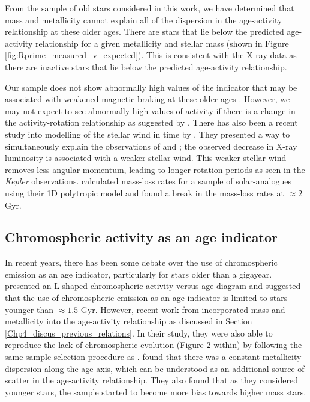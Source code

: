 From the sample of old stars considered in this work, we have determined that mass and metallicity cannot explain all of the dispersion in the age-activity relationship at these older ages. There are stars that lie below the predicted age-activity relationship for a given metallicity and stellar mass (shown in Figure \ref{fig:Rprime_measured_v_expected}). This is consistent with the X-ray data \citep{Booth_etal_2017} as there are inactive stars that lie below the predicted age-activity relationship.

Our sample does not show abnormally high values of the \Rprime indicator that may be associated with weakened magnetic braking at these older ages \citep{van_Saders_etal_2016}. However, we may not expect to see abnormally high values of activity if there is a change in the activity-rotation relationship as suggested by \citet{Booth_etal_2017}. There has also been a recent study into modelling of the stellar wind in time by \citet{OFionnagain_Vidotto_2018}. They presented a way to simultaneously explain the observations of \citet{van_Saders_etal_2016} and \citet{Booth_etal_2017}; the observed decrease in X-ray luminosity is associated with a weaker stellar wind. This weaker stellar wind removes less angular momentum, leading to longer rotation periods as seen in the \textit{Kepler} observations. \citet{OFionnagain_Vidotto_2018} calculated mass-loss rates for a sample of solar-analogues using their 1D polytropic model and found a break in the mass-loss rates at $\approx 2$ Gyr.

\subsection{Chromospheric activity as an age indicator}

In recent years, there has been some debate over the use of chromospheric emission as an age indicator, particularly for stars older than a gigayear. \citet{Pace_2013} presented an L-shaped chromospheric activity versus age diagram and suggested that the use of chromospheric emission as an age indicator is limited to stars younger than $\approx 1.5$ Gyr. However, recent work from \citet{Lorenzo_Oliveira_etal_2016} incorporated mass and metallicity into the age-activity relationship as discussed in Section \ref{Chp4_discus_previous_relations}. In their study, they were also able to reproduce the lack of chromospheric evolution (Figure 2 within) by following the same sample selection procedure as \citet{Pace_2013}. \citet{Lorenzo_Oliveira_etal_2016} found that there was a constant metallicity dispersion along the age axis, which can be understood as an additional source of scatter in the age-activity relationship. They also found that as they considered younger stars, the sample started to become more bias towards higher mass stars.


